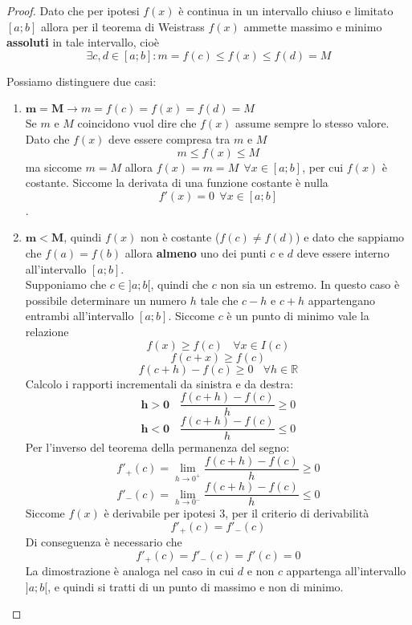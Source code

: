 \documentclass{article}     %
\newcommand\R{\mathbb{R}}
\begin{document}
        \begin{proof}
        Dato che per ipotesi $f(x)$ è continua in un intervallo chiuso e limitato $[a;b]$ allora per il teorema di Weistrass $f(x)$ ammette massimo e minimo \textbf{assoluti} in tale intervallo, cioè \[\exists c,d \in [a;b] : m=f(c)\leq f(x)\leq f(d) = M\]
        \begin{figure}
            \centering
        \end{figure}
        Possiamo distinguere due casi:
        \begin{enumerate}
            \item $\mathbf{m=M}\to m=f(c)= f(x)= f(d) = M$\\
            Se $m$ e $M$ coincidono vuol dire che $f(x)$ assume sempre lo stesso valore. Dato che $f(x)$ deve essere compresa tra $m$ e $M$\[m\leq f(x) \leq M\]
            ma siccome $m=M$ allora $f(x)=m=M ~~\forall x \in [a;b]$, per cui $f(x)$ è costante. Siccome la derivata di una funzione costante è nulla \[f'(x)=0~~\forall x \in [a;b]\].
            \item $\mathbf{m<M}$, quindi $f(x)$ non è costante ($f(c)\neq f(d)$) e dato che sappiamo che $f(a)=f(b)$ allora \textbf{almeno} uno dei punti $c$ e $d$ deve essere interno all'intervallo $[a;b]$.\\ Supponiamo che $c\in ]a;b[$, quindi che $c$ non sia un estremo. In questo caso è possibile determinare un numero $h$ tale che $c-h$ e $c+h$ appartengano entrambi all'intervallo $[a;b]$. Siccome $c$ è un punto di minimo vale la relazione 
            \[f(x) \geq f(c) ~~~~ \forall x \in I(c)\]
            \[f(c+x)\geq f(c)\]
            \[f(c+h)-f(c)\geq 0 ~~~~\forall h \in \R\]
            Calcolo i rapporti incrementali da sinistra e da destra:
            \[\mathbf{h>0}~~~~ \frac{f(c+h)-f(c)}{h}\geq 0\]
            \[\mathbf{h<0}~~~~ \frac{f(c+h)-f(c)}{h}\leq 0\]
            Per l'inverso del teorema della permanenza del segno:
            \[f'_+(c)=\lim_{h\to 0^+}\frac{f(c+h)-f(c)}{h}\geq 0\]
            \[f'_-(c)=\lim_{h\to 0^-}\frac{f(c+h)-f(c)}{h}\leq 0\]
            Siccome $f(x)$ è derivabile per ipotesi 3, per il criterio di derivabilità
            \[f'_+(c)=f'_-(c)\]
            Di conseguenza è necessario che \[f'_+(c)=f'_-(c)=f'(c)=0\]
            La dimostrazione è analoga nel caso in cui $d$ e non $c$ appartenga all'intervallo $]a;b[$, e quindi si tratti di un punto di massimo e non di minimo.
        \end{enumerate}
        \end{proof}
\end{document}
